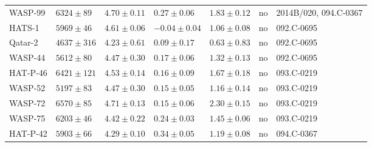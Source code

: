 \documentclass{aa}
\begin{document}
\begin{table*}[htb!]
\begin{tabular}{lllllll}
      WASP-99     &  $6324 \pm  89$      &  $4.70 \pm 0.11$    &  $ 0.27 \pm 0.06$    &  $1.83 \pm 0.12$             &             no              &  2014B/020,  094.C-0367                                                                                                  \\
       HATS-1     &  $5969 \pm  46$      &  $4.61 \pm 0.06$    &  $-0.04 \pm 0.04$    &  $1.06 \pm 0.08$             &             no              &  092.C-0695                                                                                                              \\
      Qatar-2     &  $4637 \pm 316$      &  $4.23 \pm 0.61$    &  $ 0.09 \pm 0.17$    &  $0.63 \pm 0.83$             &             no              &  092.C-0695                                                                                                              \\
      WASP-44     &  $5612 \pm  80$      &  $4.47 \pm 0.30$    &  $ 0.17 \pm 0.06$    &  $1.32 \pm 0.13$             &             no              &  092.C-0695                                                                                                              \\
     HAT-P-46     &  $6421 \pm 121$      &  $4.53 \pm 0.14$    &  $ 0.16 \pm 0.09$    &  $1.67 \pm 0.18$             &             no              &  093.C-0219                                                                                                              \\
      WASP-52     &  $5197 \pm  83$      &  $4.47 \pm 0.30$    &  $ 0.15 \pm 0.05$    &  $1.16 \pm 0.14$             &             no              &  093.C-0219                                                                                                              \\
      WASP-72     &  $6570 \pm  85$      &  $4.71 \pm 0.13$    &  $ 0.15 \pm 0.06$    &  $2.30 \pm 0.15$             &             no              &  093.C-0219                                                                                                              \\
      WASP-75     &  $6203 \pm  46$      &  $4.42 \pm 0.22$    &  $ 0.24 \pm 0.03$    &  $1.45 \pm 0.06$             &             no              &  093.C-0219                                                                                                              \\
     HAT-P-42     &  $5903 \pm  66$      &  $4.29 \pm 0.10$    &  $ 0.34 \pm 0.05$    &  $1.19 \pm 0.08$             &             no              &  094.C-0367                                                                                                              \\

\end{tabular}
\end{table*}
\end{document}
